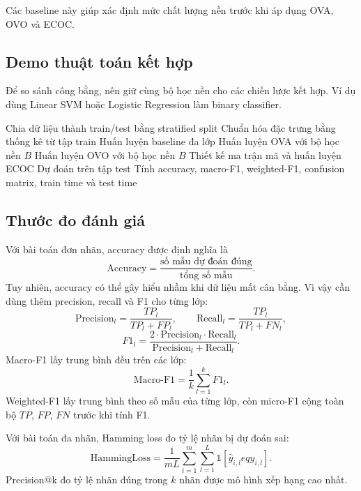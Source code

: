 Các baseline này giúp xác định mức chất lượng nền trước khi áp dụng OVA, OVO và ECOC.

\subsection{Demo thuật toán kết hợp}

Để so sánh công bằng, nên giữ cùng bộ học nền cho các chiến lược kết hợp. Ví dụ dùng Linear SVM hoặc Logistic Regression làm binary classifier.

\begin{algorithm}[H]
\caption{Quy trình demo so sánh OVA, OVO và ECOC}
Chia dữ liệu thành train/test bằng stratified split\;
Chuẩn hóa đặc trưng bằng thống kê từ tập train\;
Huấn luyện baseline đa lớp\;
Huấn luyện OVA với bộ học nền $B$\;
Huấn luyện OVO với bộ học nền $B$\;
Thiết kế ma trận mã và huấn luyện ECOC\;
Dự đoán trên tập test\;
Tính accuracy, macro-F1, weighted-F1, confusion matrix, train time và test time\;
\end{algorithm}

\subsection{Thước đo đánh giá}

Với bài toán đơn nhãn, accuracy được định nghĩa là
\[
  \text{Accuracy}=\frac{\text{số mẫu dự đoán đúng}}{\text{tổng số mẫu}}.
\]
Tuy nhiên, accuracy có thể gây hiểu nhầm khi dữ liệu mất cân bằng. Vì vậy cần dùng thêm precision, recall và F1 cho từng lớp:
\[
  \text{Precision}_l=\frac{TP_l}{TP_l+FP_l},\qquad
  \text{Recall}_l=\frac{TP_l}{TP_l+FN_l},
\]
\[
  F1_l=\frac{2\cdot \text{Precision}_l\cdot \text{Recall}_l}{\text{Precision}_l+\text{Recall}_l}.
\]
Macro-F1 lấy trung bình đều trên các lớp:
\[
  \text{Macro-F1}=\frac{1}{k}\sum_{l=1}^{k}F1_l.
\]
Weighted-F1 lấy trung bình theo số mẫu của từng lớp, còn micro-F1 cộng toàn bộ $TP$, $FP$, $FN$ trước khi tính F1.

Với bài toán đa nhãn, Hamming loss đo tỷ lệ nhãn bị dự đoán sai:
\[
  \text{HammingLoss}=\frac{1}{mL}\sum_{i=1}^{m}\sum_{l=1}^{L}\mathbb{1}[\hat{y}_{i,l}
eq y_{i,l}].
\]
Precision@k đo tỷ lệ nhãn đúng trong $k$ nhãn được mô hình xếp hạng cao nhất.

